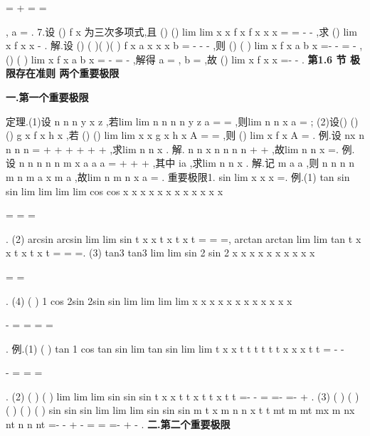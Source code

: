 =
+
=
\Rightarrow 
=




,
a =
. 
7.设
()
f x 为三次多项式,且
()
()
lim
lim
x
x
f x
f x
x
x
\to 
\to 
=
=
-
-
,求
()
lim
x
f x
x
\to 
-
. 
解.设
()
(
)(
)(
)
f x
a x
x
x
b
=
-
-
-
,则
()
(
)
lim
x
f x
a
b
x
\to 
=-
-
=
-
, 
()
(
)
lim
x
f x
a
b
x
\to 
=
-
=
-
,解得
a =
,
b =
,故
()
lim
x
f x
x
\to 
=-
-
. 
\vspace{6pt}
{\large \bfseries \textcolor{lyred}{第1.6 节 极限存在准则 两个重要极限}}

\vspace{4pt}
{\bfseries \textcolor{lyred}{一.第一个重要极限}}

\textcolor{lyred}{定理}.(1)设
n
n
n
y
x
z
\le 
\le 
,若lim
lim
n
n
n
n
y
z
a
\to \infty 
\to \infty 
=
=
,则lim
n
n
x
a
\to \infty 
=
; 
(2)设()
()
()
g x
f x
h x
\le 
\le 
,若
()
()
lim
lim
x
x
g x
h x
A
\to 
\to 
=
=
\Omega 
\Omega 
,则
()
lim
x
f x
A
\to 
=
\Omega 
. 
\textcolor{lyred}{例}.设
nx
n
n
n
n
=
+
+
+
+
+
+
\Lambda 
,求lim
n
n
x
\to \infty 
. 
解.
n
n
x
n
n
n
n
\cdots 
\le 
\le 
\cdots 
+
+
,故lim
n
n
x
\to \infty 
=. 
\textcolor{lyred}{例}.设
n
n
n
n
n
m
x
a
a
a
=
+
+
+
\Lambda 
,其中
ia \ge 
,求lim
n
n
x
\to \infty 
. 
解.记
m
a
a
\le 
\le 
\Lambda 
,则
n
n
n
n
m
n
m
a
x
m a
\le 
\le 
\cdots 
,故lim
n
m
n
x
a
\to \infty 
=
. 
\textcolor{lyred}{重要极限1}.
sin
lim
x
x
x
\to 
=. 
\textcolor{lyred}{例}.(1)
tan
sin
sin
lim
lim
lim
lim
cos
cos
x
x
x
x
x
x
x
x
x
x
x
x
\to 
\to 
\to 
\to 


=
=
\cdots 
=




. 
(2)
arcsin
arcsin
lim
lim
sin
t
x
x
t
x
t
x
t
=
\to 
\to 
=
=,
arctan
arctan
lim
lim
tan
t
x
x
t
x
t
x
t
=
\to 
\to 
=
=. 
(3)
tan3
tan3
lim
lim
sin 2
sin 2
x
x
x
x
x
x
x
x
x
x
\to 
\to 


=
\cdots 
\cdots 
=




. 
(4)
(
)
1 cos
2sin
2sin
sin
lim
lim
lim
lim
x
x
x
x
x
x
x
x
x
x
x
x
\to 
\to 
\to 
\to 


-
=
=
=
=




. 
\textcolor{lyred}{例}.(1)
(
)
tan
1 cos
tan
sin
lim
tan
sin
lim
lim
t
x
x
t
t
t
t
t
t
x
x
x
t
t
=
\to \infty 
\to 
\to 
\cdots 
-
-


-
=
=
=




. 
(2)
(
)
(
)
lim
lim
lim
sin
sin
sin
t x
x
t
t
x
t
t
x
t
t
\pi 
\pi 
\pi 
\pi 
\pi 
\pi 
\pi 
=-
\to 
\to 
\to 
-
=
=-
=-
+
. 
(3)
(
)
(
)
(
)
(
)
(
)
sin
sin
sin
lim
lim
lim
sin
sin
sin
m
t x
m n
n
x
t
t
mt
m
mt
mx
m
nx
nt
n
n
nt
\pi 
\pi 
\pi 
\pi 
=-
-
\to 
\to 
\to 
+
-
=
=
=-
+
-
. 
\vspace{4pt}
{\bfseries \textcolor{lyred}{二.第二个重要极限}}

